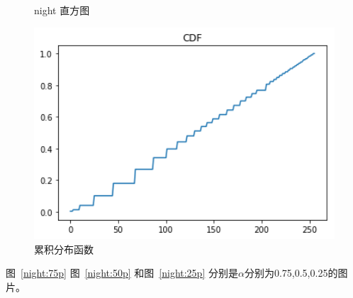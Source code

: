 \documentclass[a4paper,UTF8]{article}
\numberwithin{equation}{section}
\begin{document}
\begin{enumerate}[(\romannumeral1)]
\begin{figure}[!htbp]
\begin{minipage}[t]{0.3\textwidth}
\caption{night 直方图}
\label{night:Pcount}
\end{minipage}
\begin{minipage}[t]{0.3\textwidth}
\centering
\includegraphics[width=1.0\textwidth]{night_processed_cdf.png}
\caption{累积分布函数}
\label{night:Pcdf}
\end{minipage}
\end{figure}

图~\ref{night:75p} 图~\ref{night:50p} 和图~\ref{night:25p} 分别是$\alpha$分别为0.75,0.5,0.25的图片。\\



\end{enumerate}
\end{document}
